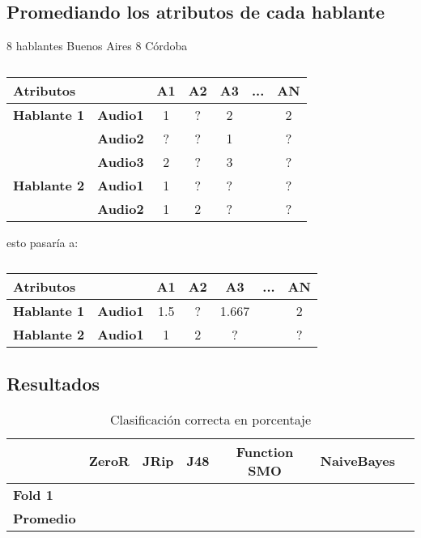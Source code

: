 \subsection{Promediando los atributos de cada hablante}

8 hablantes Buenos Aires
8 Córdoba

\begin{table}[H]
	\centering
	\begin{tabular}{|l|l|ccccc|}
		\hline
		\multicolumn{2}{|l|}{Atributos} & A1 & A2 & A3 & ... & AN \\
		\hline 
		\textbf{Hablante 1} & \textbf{Audio1} & 1 & ? & 2 & & 2\\
		& \textbf{Audio2} & ? & ? & 1 & & ? \\
		& \textbf{Audio3} & 2 & ? & 3 & & ? \\
		\hline
		\textbf{Hablante 2} & \textbf{Audio1} & 1 & ? & ? & & ? \\
		& \textbf{Audio2} & 1 & 2 & ? & & ? \\
		\hline
	\end{tabular}
	\caption{}
	\label{}
\end{table}

esto pasaría a:

\begin{table}[H]
	\centering
	\begin{tabular}{|l|l|ccccc|}
		\hline
		\multicolumn{2}{|l|}{Atributos} & A1 & A2 & A3 & ... & AN \\
		\hline 
		\textbf{Hablante 1} & \textbf{Audio1} & 1.5 & ? & 1.667 & & 2\\
		\hline
		\textbf{Hablante 2} & \textbf{Audio1} & 1 & 2 & ? & & ? \\
		\hline
	\end{tabular}
	\caption{}
	\label{}
\end{table}

\subsection{Resultados}

\begin{table}[H]
	\centering
	\begin{tabular}{|l|c|c|c|c|c|c|}
		\hline
		\textbf{}  & \textbf{ZeroR} & \textbf{JRip} & \textbf{J48} & \textbf{Function SMO} & \textbf{NaiveBayes} \\ \hline
		\textbf{Fold 1}  &  &  &  &  &  \\ \hline
		\hline \hline
		\textbf{Promedio} &  &  &  &  &  \\ \hline
	\end{tabular}
	\caption{Clasificación correcta en porcentaje}
	\label{class_corr_en_pct}
\end{table}

